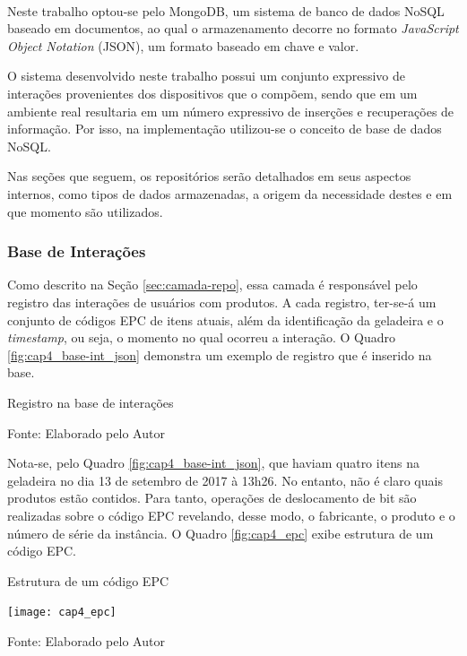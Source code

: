 Neste trabalho optou-se pelo MongoDB\textsuperscript{\textregistered}, um sistema de banco de dados NoSQL baseado em documentos, ao qual o armazenamento decorre no formato \textit{JavaScript Object Notation} (JSON), um formato baseado em chave e valor. 

O sistema desenvolvido neste trabalho possui um conjunto expressivo de interações provenientes dos dispositivos que o compõem, sendo que em um ambiente real resultaria em um número expressivo de inserções e recuperações de informação. Por isso, na implementação utilizou-se o conceito de base de dados NoSQL.

Nas seções que seguem, os repositórios serão detalhados em seus aspectos internos, como tipos de dados armazenadas, a origem da necessidade destes e em que momento são utilizados.

\ProximoForaDoSumario 
\subsubsection{Base de Interações}

Como descrito na Seção \ref{sec:camada-repo}, essa camada é responsável pelo registro das interações de usuários com produtos. A cada registro, ter-se-á um conjunto de códigos EPC de itens atuais, além da identificação da geladeira e o \textit{timestamp}, ou seja, o momento no qual ocorreu a interação. O Quadro \ref{fig:cap4_base-int_json} demonstra um exemplo de registro que é inserido na base.

\begin{quadro}[htb]
    \caption{Registro na base de interações}
    \label{fig:cap4_base-int_json}
    
    \footnotesize{Fonte: Elaborado pelo Autor}
\end{quadro}

Nota-se, pelo Quadro \ref{fig:cap4_base-int_json}, que haviam quatro itens na geladeira no dia 13 de setembro de 2017 à 13h26. No entanto, não é claro quais produtos estão contidos. Para tanto, operações de deslocamento de bit são realizadas sobre o código EPC revelando, desse modo, o fabricante, o produto e o número de série da instância. O Quadro \ref{fig:cap4_epc} exibe estrutura de um código EPC.

\begin{quadro}[htb]
    \caption{Estrutura de um código EPC}
    \label{fig:cap4_epc}
    \texttt{[image: cap4\_epc]}
    
    \footnotesize{Fonte: Elaborado pelo Autor}
\end{quadro}

